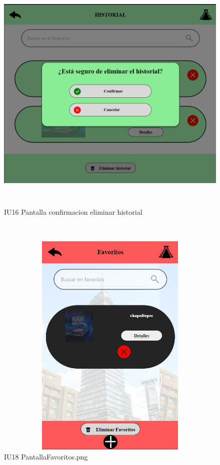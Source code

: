 \begin{figure}[htb]
        \begin{minipage}{1\textwidth}
        \centering
        \includegraphics[width=17cm, height=11cm]{front/PANTALLAS FUNCIONALES 3 DICIEMBRE/IU16_Pantalla confirmacion eliminar historial.png}
        \caption{IU16 Pantalla confirmacion eliminar historial}
    \end{minipage}%
    \\
        \begin{minipage}{1\textwidth}
        \centering
        \includegraphics[width=17cm, height=11cm]{front/PANTALLAS FUNCIONALES 3 DICIEMBRE/IU18_PantallaFavoritos.png}
        \caption{IU18 PantallaFavoritos.png}
    \end{minipage}%
\end{figure}

